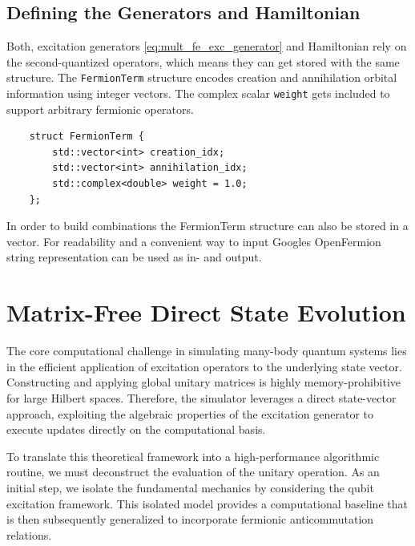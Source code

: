 \subsection{Defining the Generators and Hamiltonian}
Both, excitation generators \eqref{eq:mult_fe_exc_generator} and Hamiltonian rely on the second-quantized operators, which means they can get stored with the same structure.
The \texttt{FermionTerm} structure encodes creation and annihilation orbital information using integer vectors.
The complex scalar \texttt{weight} gets included to support arbitrary fermionic operators.
\begin{verbatim}
    struct FermionTerm {
        std::vector<int> creation_idx;
        std::vector<int> annihilation_idx;
        std::complex<double> weight = 1.0;
    };
\end{verbatim}
In order to build combinations the FermionTerm structure can also be stored in a vector.
For readability and a convenient way to input Googles OpenFermion string representation can be used as in- and output.
\cite[chapter II.A]{mcclean2019openfermion}

\section{Matrix-Free Direct State Evolution}\label{sec:matrix-free-direct-state-evolution}
The core computational challenge in simulating many-body quantum systems lies in the efficient application of excitation operators to the underlying state vector. Constructing and applying global unitary matrices is highly memory-prohibitive for large Hilbert spaces. Therefore, the simulator leverages a direct state-vector approach, exploiting the algebraic properties of the excitation generator to execute updates directly on the computational basis.

To translate this theoretical framework into a high-performance algorithmic routine, we must deconstruct the evaluation of the unitary operation. As an initial step, we isolate the fundamental mechanics by considering the qubit excitation framework. This isolated model provides a computational baseline that is then subsequently generalized to incorporate fermionic anticommutation relations.


